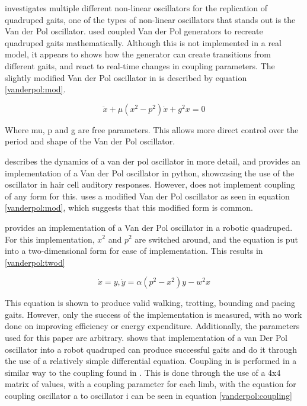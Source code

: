 \cite{Collins1994} investigates multiple different non-linear oscillators for the replication of quadruped gaits, one of the types of non-linear oscillators that stands out is the Van der Pol oscillator. \cite{Collins1994} used coupled Van der Pol generators to recreate quadruped gaits mathematically. Although this is not implemented in a real model, it appears to shows how the generator can create transitions from different gaits, and react to real-time changes in coupling parameters. The slightly modified Van der Pol oscillator in \cite{Collins1994} is described by equation \ref{vanderpol:mod}.

\begin{equation}
\ddot{x} + \mu(x^2 - p^2)\dot{x} + g^2x = 0
\label{vanderpol:mod}
\end{equation}

Where mu, p and g are free parameters. This allows more direct control over the period and shape of the Van der Pol oscillator.

\cite{Yocono2015} describes the dynamics of a van der pol oscillator in more detail, and provides an implementation of a Van der Pol oscillator in python, showcasing the use of the oscillator in hair cell auditory responses. However, \cite{Yocono2015} does not implement coupling of any form for this. \cite{Yocono2015} uses a modified Van der Pol oscillator as seen in equation \ref{vanderpol:mod}, which suggests that this modified form is common.

\cite{Liu2009} provides an implementation of a Van der Pol oscillator in a robotic quadruped. For this implementation, $x^2$ and $p^2$ are switched around, and the equation is put into a two-dimensional form for ease of implementation. This results in \ref{vanderpol:twod} 


\begin{equation}
\dot{x} = y,   \dot{y} = \alpha(p^2 - x^2)y - w^2x
\label{vanderpol:twod}
\end{equation}

This equation is shown to produce valid walking, trotting, bounding and pacing gaits. However, only the success of the implementation is measured, with no work done on improving efficiency or energy expenditure. Additionally, the parameters used for this paper are arbitrary. \cite{Liu2019} shows that implementation of a van Der Pol oscillator into a robot quadruped can produce successful gaits and do it through the use of a relatively simple differential equation. Coupling in \cite{Liu2009} is performed in a similar way to the coupling found in \cite{Collins1994}. This is done through the use of a 4x4 matrix of values, with a coupling parameter for each limb, with the equation for coupling oscillator a to oscillator i can be seen in equation \ref{vanderpol:coupling}

